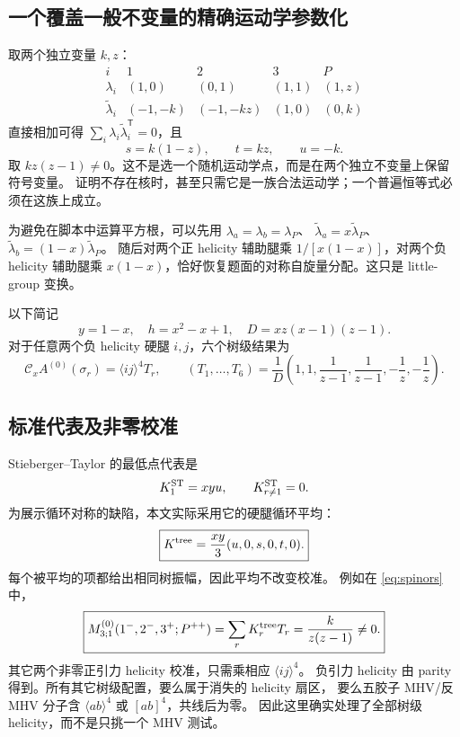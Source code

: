 \documentclass[UTF8,a4paper,11pt,fontset=fandol]{ctexart}
\newcommand{\ang}[1]{\langle #1\rangle}
\newcommand{\sq}[1]{[#1]}
\newcommand{\Cx}{\mathcal C_x}
\begin{document}
\subsection{一个覆盖一般不变量的精确运动学参数化}
取两个独立变量 $k,z$：
\begin{equation}
\begin{array}{c|rrrr}
 i&1&2&3&P\\\hline
 \lambda_i&(1,0)&(0,1)&(1,1)&(1,z)\\
 \widetilde\lambda_i&(-1,-k)&(-1,-kz)&(1,0)&(0,k)
\end{array}\label{eq:spinors}
\end{equation}
直接相加可得 $\sum_i\lambda_i\widetilde\lambda_i^{\mathsf T}=0$，且
\begin{equation}
 s=k(1-z),\qquad t=kz,\qquad u=-k.
\end{equation}
取 $kz(z-1)\ne0$。这不是选一个随机运动学点，而是在两个独立不变量上保留符号变量。
证明不存在核时，甚至只需它是一族合法运动学；一个普遍恒等式必须在这族上成立。

为避免在脚本中运算平方根，可以先用
$\lambda_a=\lambda_b=\lambda_P$、
$\widetilde\lambda_a=x\widetilde\lambda_P$、
$\widetilde\lambda_b=(1-x)\widetilde\lambda_P$。
随后对两个正 helicity 辅助腿乘 $1/[x(1-x)]$，对两个负 helicity 辅助腿乘
$x(1-x)$，恰好恢复题面的对称自旋量分配。这只是 little-group 变换。

以下简记
\begin{equation}
 y=1-x,\quad h=x^2-x+1,\quad D=xz(x-1)(z-1).
\end{equation}
对于任意两个负 helicity 硬腿 $i,j$，六个树级结果为
\begin{equation}
 \Cx A^{(0)}(\sigma_r)=\ang{ij}^4 T_r,\qquad
 (T_1,\ldots,T_6)=\frac1D
 \left(1,1,\frac1{z-1},\frac1{z-1},-\frac1z,-\frac1z\right).
\label{eq:tree-vector}
\end{equation}

\subsection{标准代表及非零校准}
Stieberger--Taylor 的最低点代表\cite{ST}是
\begin{equation}
 K^{\rm ST}_1=xyu,\qquad K^{\rm ST}_{r\ne1}=0.
\label{eq:single-kernel}
\end{equation}
为展示循环对称的缺陷，本文实际采用它的硬腿循环平均：
\begin{equation}
 \boxed{K^{\rm tree}=\frac{xy}{3}(u,0,s,0,t,0).}
\label{eq:tree-kernel}
\end{equation}
每个被平均的项都给出相同树振幅，因此平均不改变校准。
例如在 \eqref{eq:spinors} 中，
\begin{equation}
 \boxed{M^{(0)}_{3;1}(1^-,2^-,3^+;P^{++})
 =\sum_r K^{\rm tree}_r T_r=\frac{k}{z(z-1)}\ne0.}
\label{eq:calibration}
\end{equation}
其它两个非零正引力 helicity 校准，只需乘相应 $\ang{ij}^4$。
负引力 helicity 由 parity 得到。所有其它树级配置，要么属于消失的 helicity 扇区，
要么五胶子 MHV/反 MHV 分子含 $\ang{ab}^4$ 或 $\sq{ab}^4$，共线后为零。
因此这里确实处理了全部树级 helicity，而不是只挑一个 MHV 测试。
\end{document}
